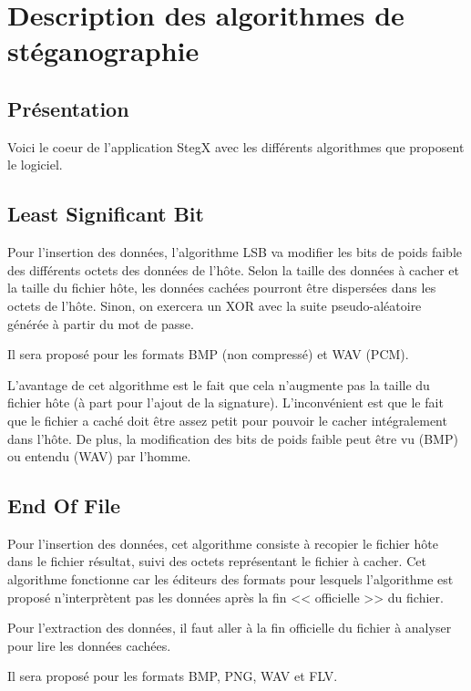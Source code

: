 \documentclass[11pt]{article}
\begin{document}
\section{Description des algorithmes de stéganographie}

\subsection{Présentation}

Voici le coeur de l'application StegX avec les différents algorithmes que 
proposent le logiciel. 

\subsection{Least Significant Bit}

Pour l'insertion des données, l'algorithme LSB va modifier les bits de 
poids faible des différents octets des données de l'hôte. Selon la taille des
données à cacher et la taille du fichier hôte, les données cachées pourront 
être dispersées dans les octets de l'hôte. Sinon, on exercera un XOR avec 
la suite pseudo-aléatoire générée à partir du mot de passe. 

Il sera proposé pour les formats BMP (non compressé) et WAV (PCM).

L'avantage de cet algorithme est le fait que cela n'augmente pas la 
taille du fichier hôte (à part pour l'ajout de la signature). 
L'inconvénient est que le fait que le fichier a caché doit être assez petit 
pour pouvoir le cacher intégralement dans l'hôte. De plus, la modification 
des bits de poids faible peut être vu (BMP) ou entendu (WAV) par l'homme. 

\subsection{End Of File}

Pour l'insertion des données, cet algorithme consiste à recopier le fichier 
hôte dans le fichier résultat, suivi des octets représentant le fichier 
à cacher. Cet algorithme fonctionne car les éditeurs 
des formats pour lesquels l'algorithme est proposé n'interprètent pas les 
données après la fin << officielle >> du fichier. 

Pour l'extraction des données, il faut aller à la fin officielle du fichier 
à analyser pour lire les données cachées. 

Il sera proposé pour les formats BMP, PNG, WAV et FLV.
\end{document}
